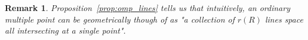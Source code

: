 \documentclass{article}
\newtheorem{remark}[theorem]{Remark}
\newtheorem{corollary}[theorem]{Corollary}
\DeclareMathOperator{\edim}{edim}
\numberwithin{theorem}{section}
\begin{document}
\begin{remark}\label{rem:omp_lines_edim}
    \textup{Proposition~\ref{prop:omp_lines} tells us that intuitively, an ordinary multiple point can be geometrically though of as "a collection of $r(R)$ lines space all intersecting at a single point".  }
\end{remark}







\end{document}
